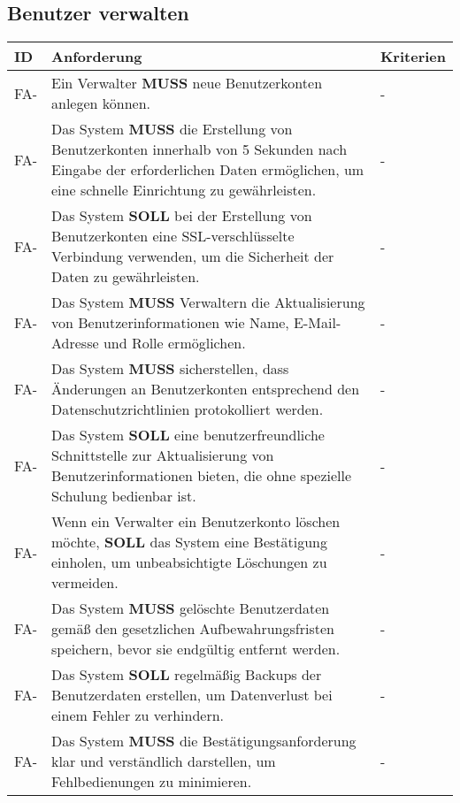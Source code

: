 \subsection{Benutzer verwalten}
\begin{tabular} {|p{}|p{11cm}|p{}|}
	\hline
	ID & Anforderung & Kriterien \\
	\hline
	FA-
	& Ein Verwalter \textbf{MUSS} neue Benutzerkonten anlegen können. 
	& - \\
	\hline
	FA-
	& Das System \textbf{MUSS} die Erstellung von Benutzerkonten innerhalb von 5 Sekunden nach Eingabe der erforderlichen Daten ermöglichen, um eine schnelle Einrichtung zu gewährleisten. 
	& - \\ 
	\hline
	FA-
	& Das System \textbf{SOLL} bei der Erstellung von Benutzerkonten eine SSL-verschlüsselte Verbindung verwenden, um die Sicherheit der Daten zu gewährleisten.
	& - \\ 
	\hline
	FA-
	& Das System \textbf{MUSS} Verwaltern die Aktualisierung von Benutzerinformationen wie Name, E-Mail-Adresse und Rolle ermöglichen.
	& - \\ 
	\hline
	FA-
	& Das System \textbf{MUSS} sicherstellen, dass Änderungen an Benutzerkonten entsprechend den Datenschutzrichtlinien protokolliert werden.
	& - \\ 
	\hline
	FA-
	& Das System \textbf{SOLL} eine benutzerfreundliche Schnittstelle zur Aktualisierung von Benutzerinformationen bieten, die ohne spezielle Schulung bedienbar ist.
	& - \\ 
	\hline
	FA-
	& Wenn ein Verwalter ein Benutzerkonto löschen möchte, \textbf{SOLL} das System eine Bestätigung einholen, um unbeabsichtigte Löschungen zu vermeiden.
	& - \\ 
	\hline
	FA-
	& Das System \textbf{MUSS} gelöschte Benutzerdaten gemäß den gesetzlichen Aufbewahrungsfristen speichern, bevor sie endgültig entfernt werden.
	& - \\ 
	\hline
	FA-
	& Das System \textbf{SOLL} regelmäßig Backups der Benutzerdaten erstellen, um Datenverlust bei einem Fehler zu verhindern.
	& - \\ 
	\hline
	FA-
	& Das System \textbf{MUSS} die Bestätigungsanforderung klar und verständlich darstellen, um Fehlbedienungen zu minimieren.
	& - \\ 
	\hline
\end{tabular}

\newpage

